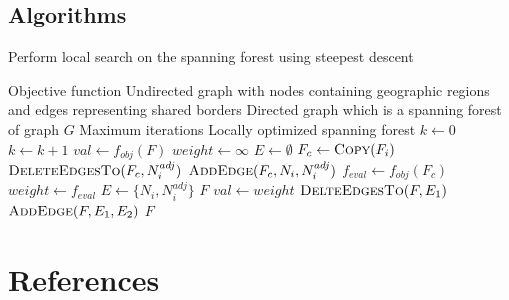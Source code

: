 \documentclass{article}
\newcommand{\Desc}[2]{\State \makebox[2em][l]{#1}#2}
\begin{document}
\subsection{Algorithms}
\begin{algorithm}[H]
\caption{Perform local search on the spanning forest using steepest descent}\label{alg:spanning-tree-greedy}
\begin{algorithmic}
\Input
\Desc{\(f_{obj}\)}{Objective function}
\Desc{\(G\)}{Undirected graph with nodes containing geographic regions and edges representing shared borders}
\Desc{\(F\)}{Directed graph which is a spanning forest of graph \(G\)}
\Desc{\(k_{\text{max}}\)}{Maximum iterations}
\EndInput
\Output
\Desc{\(F\)}{Locally optimized spanning forest}
\EndOutput
\State \(k \gets 0\)
\State \(k \gets k+1\)
\State \(val \gets f_{obj}(F)\)
\State \(weight \gets \infty\)
\State \(E \gets \emptyset\)
\State \(F_{c} \gets \Call{Copy}{F_i}\)
\State \(\Call{DeleteEdgesTo}{F_{c}, N^{adj}_i}\)
\State \(\Call{AddEdge}{F_{c}, N_i, N^{adj}_i}\)
\State \(f_{eval} \gets f_{obj}(F_{c})\)
\State \(weight \gets f_{eval}\)
\State \(E \gets \{N_i, N^{adj}_i\}\)
\EndIf
\EndFor
\EndFor
\EndFor
{}
\State \Return \(F\)
\EndIf
\State \(val \gets weight\)
\State \(\Call{DelteEdgesTo}{F, E_1}\)
\State \(\Call{AddEdge}{F, E_1, E_2}\)
\EndWhile
\State \Return \(F\)
\end{algorithmic}
\end{algorithm}

\newpage
\section{References}
\printbibliography[heading=none]
\end{document}
